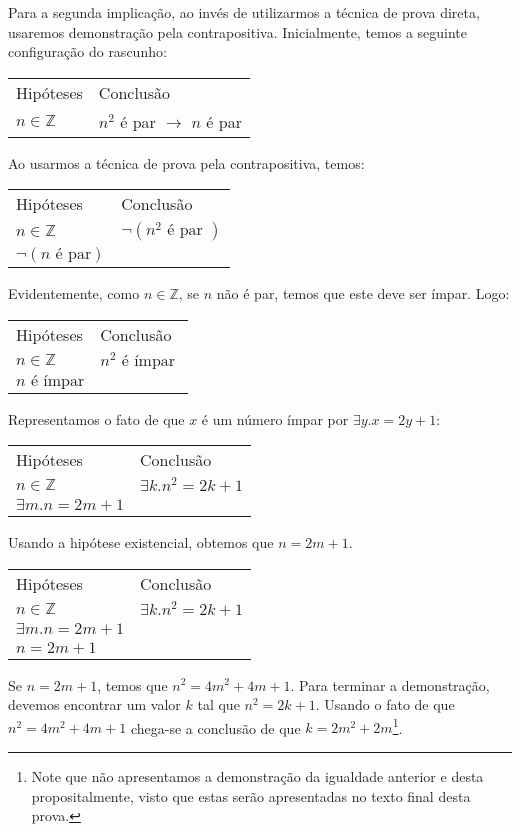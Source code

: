 \begin{Example}
Para a segunda implicação, ao invés de utilizarmos a técnica de prova
direta, usaremos demonstração pela contrapositiva. Inicialmente, temos
a seguinte configuração do rascunho:
\begin{flushleft}
\begin{tabular}{ll}
Hipóteses & Conclusão \\
$n\in\mathbb{Z}$ & $n^2$ é par $\to$ $n$ é par\\
\end{tabular}
\end{flushleft}
Ao usarmos a técnica de prova pela contrapositiva, temos:
\begin{flushleft}
\begin{tabular}{ll}
Hipóteses & Conclusão \\
$n\in\mathbb{Z}$ & $\neg(n^2\text{ é par })$\\
$\neg(n\text{ é par})$ & \\
\end{tabular}
\end{flushleft}
Evidentemente, como $n\in\mathbb{Z}$, se $n$ não é par, temos que este
deve ser ímpar. Logo:
\begin{flushleft}
\begin{tabular}{ll}
Hipóteses & Conclusão \\
$n\in\mathbb{Z}$ & $n^2\text{ é ímpar }$\\
$n\text{ é ímpar}$ & \\
\end{tabular}
\end{flushleft}
Representamos o fato de que $x$ é um número ímpar por $\exists y. x = 2y + 1$:
\begin{flushleft}
\begin{tabular}{ll}
Hipóteses & Conclusão \\
$n\in\mathbb{Z}$ & $\exists k. n^2 = 2k + 1$\\
$\exists m. n = 2m + 1$ & \\
\end{tabular}
\end{flushleft}
Usando a hipótese existencial, obtemos que $n = 2m + 1$.
\begin{flushleft}
\begin{tabular}{ll}
Hipóteses & Conclusão \\
$n\in\mathbb{Z}$ & $\exists k. n^2 = 2k + 1$\\
$\exists m. n = 2m + 1$ & \\
$n = 2m + 1$ &
\end{tabular}
\end{flushleft}
Se $n = 2m + 1$, temos que $n^2 = 4m^2 + 4m + 1$. Para terminar a
demonstração, devemos encontrar um valor $k$ tal que $n^2 = 2k +
1$. Usando o fato de que $n^2 = 4m^2 + 4m + 1$ chega-se a conclusão de
que $k = 2m^2 + 2m$\footnote{Note que não apresentamos a demonstração
  da igualdade anterior e desta propositalmente, visto que estas serão
apresentadas no texto final desta prova.}.


\end{Example}
